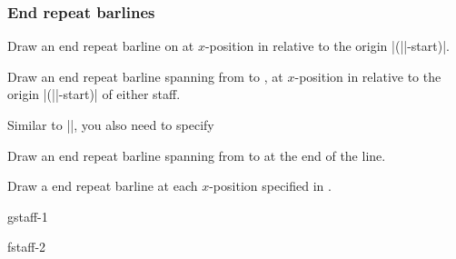 \subsubsection{End repeat barlines}\label{sec:multistaff:barlines:end}
\begin{command}{\tmendrepeatbarline{}}
  Draw an end repeat barline on  at $x$-position  in 
  relative to the origin |(||-start)|.
\end{command}
\begin{command}{\tmendrepeatbarline*{}}
  Draw an end repeat barline spanning from  to 
  , at $x$-position  in relative to 
  the origin |(||-start)| of either staff.

  Similar to |\tmstartrepeatbarline*|, you also need to specify 
\end{command}
\begin{command}{\tmendrepeatbarlineendline{}}
  Draw an end repeat barline spanning from  to 
   at the end of the line. 
\end{command}
\begin{command}{\tmendrepeatbarlineinline{}}
  Draw a end repeat barline at each $x$-position specified in .
\end{command}
\begin{codeexample}[]
\begin{tmline}%
\begin{tmstaff}{g}{staff-1}\end{tmstaff}%
\begin{tmstaff}{f}{staff-2}
\end{tmstaff}%
%
%
%
%
\end{tmline}
\end{codeexample}
